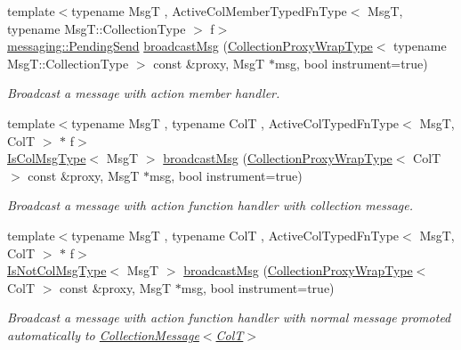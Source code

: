 \begin{DoxyCompactItemize}
{\footnotesize template$<$typename MsgT , Active\+Col\+Member\+Typed\+Fn\+Type$<$ Msg\+T, typename Msg\+T\+::\+Collection\+Type $>$ f$>$ }\\\hyperlink{structvt_1_1messaging_1_1_pending_send}{messaging\+::\+Pending\+Send} \hyperlink{structvt_1_1vrt_1_1collection_1_1_collection_manager_a9cadcebd1d7c26512091f9624a23a02c}{broadcast\+Msg} (\hyperlink{structvt_1_1vrt_1_1collection_1_1_collection_manager_a56458ed7f9bb22b631b9b3a745f42f94}{Collection\+Proxy\+Wrap\+Type}$<$ typename Msg\+T\+::\+Collection\+Type $>$ const \&proxy, MsgT $\ast$msg, bool instrument=true)
\begin{DoxyCompactList}\small\item\em Broadcast a message with action member handler. \end{DoxyCompactList}\item 
{\footnotesize template$<$typename MsgT , typename ColT , Active\+Col\+Typed\+Fn\+Type$<$ Msg\+T, Col\+T $>$ $\ast$ f$>$ }\\\hyperlink{structvt_1_1vrt_1_1collection_1_1_collection_manager_a21c21612c806016788057aeab142af20}{Is\+Col\+Msg\+Type}$<$ MsgT $>$ \hyperlink{structvt_1_1vrt_1_1collection_1_1_collection_manager_a2ea2ea93c25a438f0b9b6af390ef0881}{broadcast\+Msg} (\hyperlink{structvt_1_1vrt_1_1collection_1_1_collection_manager_a56458ed7f9bb22b631b9b3a745f42f94}{Collection\+Proxy\+Wrap\+Type}$<$ ColT $>$ const \&proxy, MsgT $\ast$msg, bool instrument=true)
\begin{DoxyCompactList}\small\item\em Broadcast a message with action function handler with collection message. \end{DoxyCompactList}\item 
{\footnotesize template$<$typename MsgT , typename ColT , Active\+Col\+Typed\+Fn\+Type$<$ Msg\+T, Col\+T $>$ $\ast$ f$>$ }\\\hyperlink{structvt_1_1vrt_1_1collection_1_1_collection_manager_ae376deeefd4f89a0b1c93849977715d9}{Is\+Not\+Col\+Msg\+Type}$<$ MsgT $>$ \hyperlink{structvt_1_1vrt_1_1collection_1_1_collection_manager_a0aa73c7acf95f668330d9c31ce12b581}{broadcast\+Msg} (\hyperlink{structvt_1_1vrt_1_1collection_1_1_collection_manager_a56458ed7f9bb22b631b9b3a745f42f94}{Collection\+Proxy\+Wrap\+Type}$<$ ColT $>$ const \&proxy, MsgT $\ast$msg, bool instrument=true)
\begin{DoxyCompactList}\small\item\em Broadcast a message with action function handler with normal message promoted automatically to {\ttfamily \hyperlink{structvt_1_1vrt_1_1collection_1_1_collection_message}{Collection\+Message$<$\+Col\+T$>$}} \end{DoxyCompactList}\item 

\end{DoxyCompactItemize}
